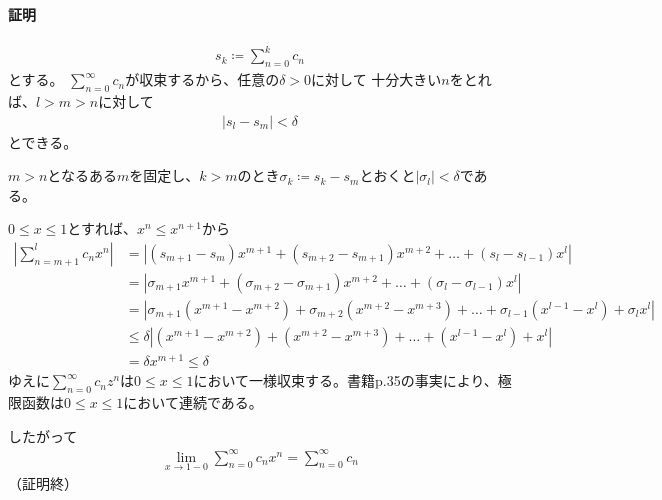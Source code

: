 \paragraph{証明}
\begin{align*}
    s_k\coloneqq\sum_{n=0}^{k}c_n
\end{align*}
とする。
$\sum_{n=0}^{\infty}c_n$が収束するから、任意の$\delta>0$に対して
十分大きい$n$をとれば、$l>m>n$に対して
\begin{align*}
    |s_l-s_m|<\delta
\end{align*}
とできる。

$m>n$となるある$m$を固定し、$k>m$のとき$\sigma_k\coloneqq s_k-s_m$とおくと$|\sigma_l|<\delta$である。

$0\le x\le 1$とすれば、$x^n\le x^{n+1}$から
\begin{align*}
    \left|\sum_{n=m+1}^{l}c_nx^n\right|
    &=\left|(s_{m+1}-s_m)x^{m+1}+(s_{m+2}-s_{m+1})x^{m+2}+\dots+(s_l-s_{l-1})x^l\right|\\
    &=\left|\sigma_{m+1}x^{m+1}+(\sigma_{m+2}-\sigma_{m+1})x^{m+2}+\dots+(\sigma_l-\sigma_{l-1})x^l\right|\\
    &=\left|\sigma_{m+1}(x^{m+1}-x^{m+2})+\sigma_{m+2}(x^{m+2}-x^{m+3})+\dots+\sigma_{l-1}(x^{l-1}-x^l)+\sigma_lx^l\right|\\
    &\le\delta\left|(x^{m+1}-x^{m+2})+(x^{m+2}-x^{m+3})+\dots+(x^{l-1}-x^l)+x^l\right|\\
    &=\delta x^{m+1}\le\delta
\end{align*}
ゆえに$\sum_{n=0}^{\infty}c_nz^n$は$0\le x\le 1$において一様収束する。書籍p.35の事実により、極限函数は$0\le x\le 1$において連続である。

したがって
\begin{align*}
    \lim_{x\to 1-0}\sum_{n=0}^{\infty}c_nx^n=\sum_{n=0}^{\infty}c_n
\end{align*}
（証明終）